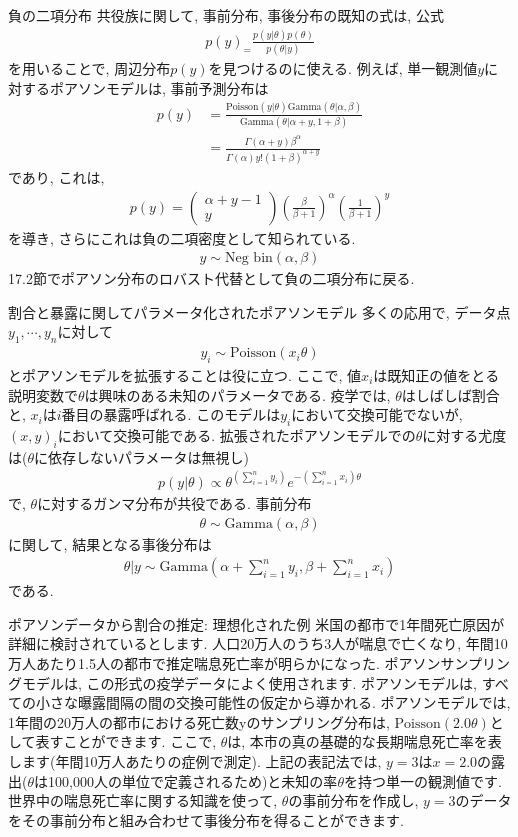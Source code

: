 \documentclass[10pt,dvipdfmx,a4]{beamer}
\newcommand{\eq}[1]{\begin{align}#1\end{align}}
\newcommand{\eqn}[1]{\begin{align*}#1\end{align*}}
\begin{document}

\begin{frame}{負の二項分布}
共役族に関して, 事前分布, 事後分布の既知の式は, 公式
\eqn{p(y)_=\frac{p(y|\theta)p(\theta)}{p(\theta|y)}}
を用いることで, 周辺分布$p(y)$を見つけるのに使える.
例えば, 単一観測値$y$に対するポアソンモデルは, 事前予測分布は
\eqn{p(y)&=\frac{\text{Poisson}(y|\theta)\text{Gamma}(\theta|\alpha,\beta)}{\text{Gamma}(\theta|\alpha+y,1+\beta)}\\
&=\frac{\Gamma(\alpha+y)\beta^{\alpha}}{\Gamma(\alpha)y!(1+\beta)^{\alpha+y}}}
であり, これは,
\eqn{p(y)=\left(\begin{array}{c}\alpha+y-1\\y\end{array}\right) \left(\frac{\beta}{\beta+1}\right)^{\alpha}\left(\frac{1}{\beta+1}\right)^y}
を導き, さらにこれは負の二項密度として知られている.
\eqn{y\sim \text{Neg bin}(\alpha,\beta)}
17.2節でポアソン分布のロバスト代替として負の二項分布に戻る.
\end{frame}


\begin{frame}{割合と暴露に関してパラメータ化されたポアソンモデル}
多くの応用で, データ点$y_1,\cdots,y_n$に対して
\eq{y_i\sim\text{Poisson}(x_i\theta)}
とポアソンモデルを拡張することは役に立つ. 
ここで, 値$x_i$は既知正の値をとる説明変数で$\theta$は興味のある未知のパラメータである.
疫学では, $\theta$はしばしば割合と, $x_i$は$i$番目の暴露呼ばれる.
このモデルは$y_i$において交換可能でないが, $(x,y)_i$において交換可能である.
拡張されたポアソンモデルでの$\theta$に対する尤度は($\theta$に依存しないパラメータは無視し)
\eqn{p(y|\theta)\propto \theta^{(\sum_{i=1}^n y_i)}e^{-(\sum_{i=1}^n x_i)\theta}}
で, $\theta$に対するガンマ分布が共役である.
事前分布
\eqn{\theta\sim\text{Gamma}(\alpha,\beta)}
に関して, 結果となる事後分布は
\eq{\theta|y \sim \text{Gamma}\left(\alpha+\sum_{i=1}^n y_i, \beta+\sum_{i=1}^n x_i\right)}
である.
\end{frame}


\begin{frame}{ポアソンデータから割合の推定: 理想化された例}
米国の都市で1年間死亡原因が詳細に検討されているとします.
人口20万人のうち3人が喘息で亡くなり, 年間10万人あたり1.5人の都市で推定喘息死亡率が明らかになった.
ポアソンサンプリングモデルは, この形式の疫学データによく使用されます.
ポアソンモデルは, すべての小さな曝露間隔の間の交換可能性の仮定から導かれる.
ポアソンモデルでは, 1年間の20万人の都市における死亡数yのサンプリング分布は, $\text{Poisson}(2.0\theta)$として表すことができます.
ここで, $\theta$は, 本市の真の基礎的な長期喘息死亡率を表します(年間10万人あたりの症例で測定).
上記の表記法では, $y = 3$は$x = 2.0$の露出($\theta$は100,000人の単位で定義されるため)と未知の率$\theta$を持つ単一の観測値です.
世界中の喘息死亡率に関する知識を使って, $\theta$の事前分布を作成し, $y=3$のデータをその事前分布と組み合わせて事後分布を得ることができます.
\end{frame}
\end{document}
